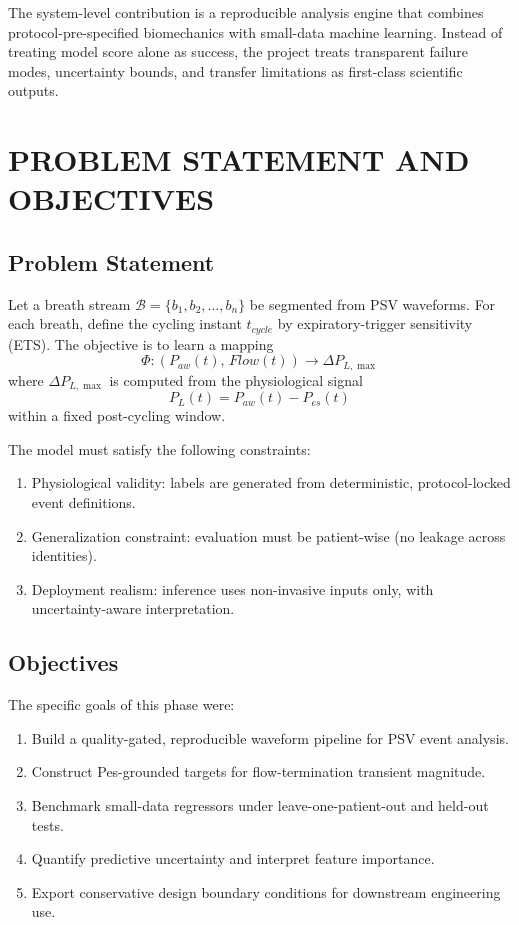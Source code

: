 \documentclass[9pt,twocolumn]{article}
\begin{document}
The system-level contribution is a reproducible analysis engine that combines protocol-pre-specified biomechanics with small-data machine learning. Instead of treating model score alone as success, the project treats transparent failure modes, uncertainty bounds, and transfer limitations as first-class scientific outputs.

\section{PROBLEM STATEMENT AND OBJECTIVES}

\subsection{Problem Statement}

Let a breath stream $\mathcal{B}=\{b_1,b_2,\ldots,b_n\}$ be segmented from PSV waveforms. For each breath, define the cycling instant $t_{cycle}$ by expiratory-trigger sensitivity (ETS). The objective is to learn a mapping
\[
\Phi: (P_{aw}(t),\,Flow(t)) \rightarrow \Delta P_{L,\max}
\]
where $\Delta P_{L,\max}$ is computed from the physiological signal
\[
P_L(t)=P_{aw}(t)-P_{es}(t)
\]
within a fixed post-cycling window.

The model must satisfy the following constraints:
\begin{enumerate}[leftmargin=14pt]
\item Physiological validity: labels are generated from deterministic, protocol-locked event definitions.
\item Generalization constraint: evaluation must be patient-wise (no leakage across identities).
\item Deployment realism: inference uses non-invasive inputs only, with uncertainty-aware interpretation.
\end{enumerate}

\subsection{Objectives}

The specific goals of this phase were:
\begin{enumerate}[leftmargin=14pt]
\item Build a quality-gated, reproducible waveform pipeline for PSV event analysis.
\item Construct Pes-grounded targets for flow-termination transient magnitude.
\item Benchmark small-data regressors under leave-one-patient-out and held-out tests.
\item Quantify predictive uncertainty and interpret feature importance.
\item Export conservative design boundary conditions for downstream engineering use.
\end{enumerate}
\end{document}
